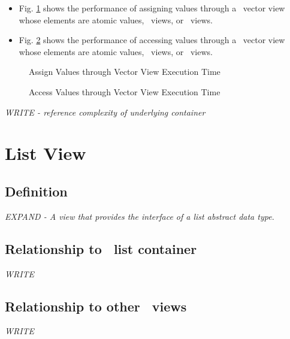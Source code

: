 \begin{itemize}
\item
Fig. \ref{fig:vec-vw-assign-exper}
shows the performance of assigning values through a \stapl\ vector view
whose elements are atomic values, \stl\ views, or \stapl\ views.
\item
Fig. \ref{fig:vec-vw-access-exper}
shows the performance of accessing values through a \stapl\ vector view
whose elements are atomic values, \stl\ views, or \stapl\ views.
\end{itemize}

\begin{figure}[p]
\caption{Assign Values through Vector View Execution Time}
\label{fig:vec-vw-assign-exper}
\end{figure}

\begin{figure}[p]
\caption{Access Values through Vector View Execution Time}
\label{fig:vec-vw-access-exper}
\end{figure}

\emph{WRITE - reference complexity of underlying container}


\section{List View} \label{sec-list-vw}

\subsection{Definition}

\textit{EXPAND - A view that provides the interface of a list abstract data type.}

\subsection{Relationship to \stapl\ list container}

\textit{WRITE}

\subsection{Relationship to other \stapl\ views}

\textit{WRITE}

